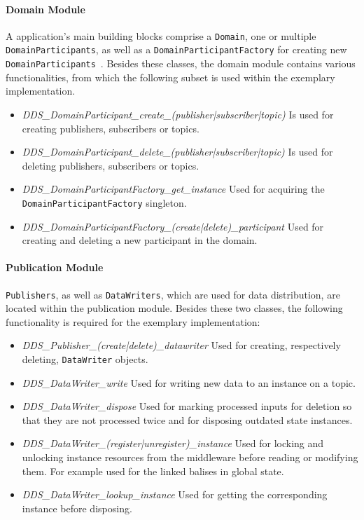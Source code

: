\paragraph{Domain Module}
A  application's main building blocks comprise a \texttt{Domain}, one or multiple \texttt{DomainParticipants}, as well as a \texttt{DomainParticipantFactory} for creating new \texttt{DomainParticipants}~\cite{omgDDSspec}.
Besides these classes, the domain module contains various functionalities, from which the following subset is used within the exemplary implementation.

\begin{itemize}
\item \textit{DDS\_DomainParticipant\_create\_(publisher|subscriber|topic)} Is used for creating  publishers, subscribers or topics.
\item \textit{DDS\_DomainParticipant\_delete\_(publisher|subscriber|topic)} Is used for deleting  publishers, subscribers or topics.
\item \textit{DDS\_DomainParticipantFactory\_get\_instance} Used for acquiring the \texttt{DomainParticipantFactory} singleton.
\item \textit{DDS\_DomainParticipantFactory\_(create|delete)\_participant} Used for creating and deleting a new participant in the  domain.
\end{itemize}


\paragraph{Publication Module}
\texttt{Publishers}, as well as \texttt{DataWriters}, which are used for data distribution, are located within the publication module.
Besides these two classes, the following functionality is required for the exemplary implementation:

\begin{itemize}
\item \textit{DDS\_Publisher\_(create|delete)\_datawriter} Used for creating, respectively deleting, \texttt{DataWriter} objects.
\item \textit{DDS\_DataWriter\_write} Used for writing new data to an instance on a  topic.
\item \textit{DDS\_DataWriter\_dispose} Used for marking processed inputs for deletion so that they are not processed twice and for disposing outdated state instances.
\item \textit{DDS\_DataWriter\_(register|unregister)\_instance} Used for locking and unlocking instance resources from the middleware before reading or modifying them. For example used for the linked balises in global state.
\item \textit{DDS\_DataWriter\_lookup\_instance} Used for getting the corresponding instance before disposing.
\end{itemize}


